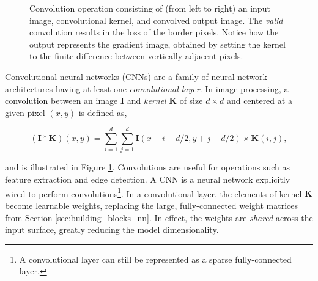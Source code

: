 \begin{figure}[h]


\caption{Convolution operation consisting of (from left to right) an input image, convolutional kernel, and convolved output image. The \emph{valid} convolution results in the loss of the border pixels. Notice how the output represents the gradient image, obtained by setting the kernel to the finite difference between vertically adjacent pixels.}
\label{fig:convolution_operation}
\end{figure}

Convolutional neural networks (CNNs) are a family of neural network architectures having at least one \emph{convolutional layer}. In image processing, a convolution between an image $\mathbf{I}$ and \emph{kernel} $\mathbf{K}$ of size $d \times d$ and centered at a given pixel $(x, y)$ is defined as,

\begin{equation}
(\mathbf{I} * \mathbf{K})(x, y) = \sum_{i = 1}^{d}\sum_{j = 1}^{d} \mathbf{I}(x + i -d/2, y + j - d/2) \times \mathbf{K}(i, j),
\label{eq:convolution_operation}
\end{equation}

and is illustrated in Figure \ref{fig:convolution_operation}. Convolutions are useful for operations such as feature extraction and edge detection. A CNN is a neural network explicitly wired to perform convolutions\footnote{A convolutional layer can still be represented as a sparse fully-connected layer.}. In a convolutional layer, the elements of kernel $\mathbf{K}$ become learnable weights, replacing the large, fully-connected weight matrices from Section \ref{sec:building_blocks_nn}. In effect, the weights are \emph{shared} across the input surface, greatly reducing the model dimensionality.

